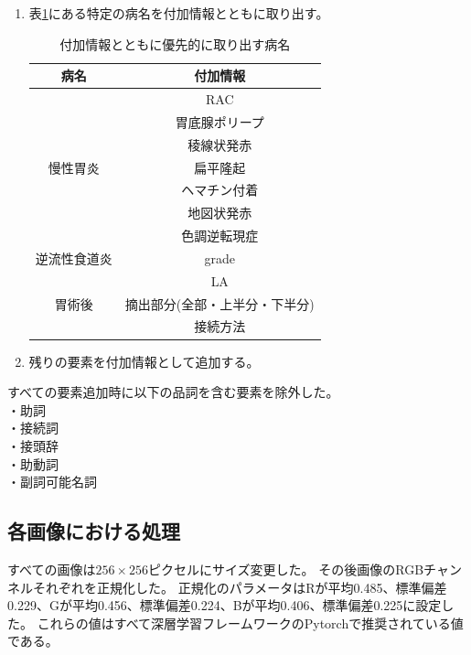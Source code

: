 \begin{enumerate}
\begin{table}[htbp]
        \end{table}
    \item 表\ref{tb:nl4}にある特定の病名を付加情報とともに取り出す。
        \begin{table}[htbp]
            \caption[]{付加情報とともに優先的に取り出す病名}
            \label{tb:nl4}
            \centering
            \normalsize
            \begin{tabular}{c|c} \hline
                病名 & 付加情報 \\ \hline \hline
                         & RAC \\ \cline{2-2}
                         & 胃底腺ポリープ \\ \cline{2-2}
                         & 稜線状発赤 \\ \cline{2-2}
                慢性胃炎 & 扁平隆起 \\ \cline{2-2}
                         & ヘマチン付着 \\ \cline{2-2}
                         & 地図状発赤 \\ \cline{2-2}
                         & 色調逆転現症 \\ \hline
                逆流性食道炎 & grade \\ \cline{2-2}
                             & LA \\ \hline
                胃術後 & 摘出部分(全部・上半分・下半分) \\ \cline{2-2}
                       & 接続方法 \\ \hline
            \end{tabular}
        \end{table}
    \item 残りの要素を付加情報として追加する。
\end{enumerate}
すべての要素追加時に以下の品詞を含む要素を除外した。 \\
    ・助詞 \\
    ・接続詞 \\
    ・接頭辞 \\
    ・助動詞 \\
    ・副詞可能名詞

\subsection{各画像における処理}
すべての画像は$256 \times 256$ピクセルにサイズ変更した。
その後画像のRGBチャンネルそれぞれを正規化した。
正規化のパラメータはRが平均0.485、標準偏差0.229、Gが平均0.456、標準偏差0.224、Bが平均0.406、標準偏差0.225に設定した。
これらの値はすべて深層学習フレームワークのPytorch\cite{Pytorch}で推奨されている値である。
